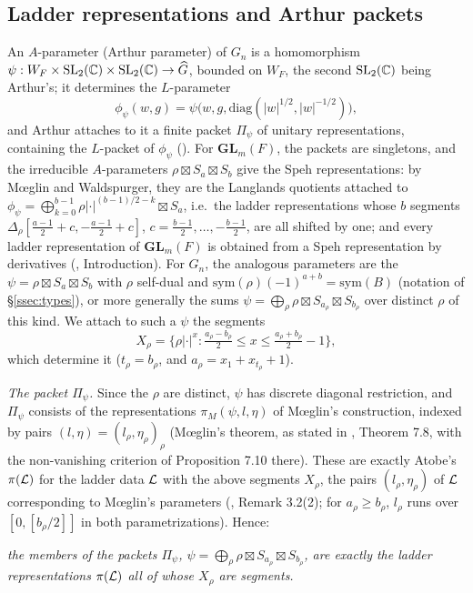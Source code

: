 \documentclass[a4paper,12pt,leqno]{amsart}
\theoremstyle{plain}
\theoremstyle{definition}
\begin{document}
\subsection{Ladder representations and Arthur packets}\label{ssec:arthur}
An $A$-parameter (Arthur parameter) of $G_n$
is a homomorphism $\psi:W_F\times\mathrm{SL}_2(\mathbb{C})\times\mathrm{SL}_2(\mathbb{C})\to\widehat G$, bounded on
$W_F$, the second $\mathrm{SL}_2(\mathbb{C})$ being Arthur's; it determines the $L$-parameter
\[\phi_\psi(w,g)=\psi\big(w,g,\mathrm{diag}(|w|^{1/2},|w|^{-1/2})\big),\]
and Arthur attaches to it a finite
packet $\Pi_\psi$ of unitary representations, containing the $L$-packet of $\phi_\psi$ (\cite{Art13}). For
$\mathbf{GL}_m(F)$, the packets are singletons, and the irreducible $A$-parameters
$\rho\boxtimes S_a\boxtimes S_b$ give the Speh representations: by M\oe glin and Waldspurger, they are
the Langlands quotients attached to $\phi_\psi=\bigoplus_{k=0}^{b-1}\rho|\cdot|^{(b-1)/2-k}\boxtimes
S_a$, i.e.\ the ladder representations whose $b$ segments $\Delta_\rho[\frac{a-1}2+c,-\frac{a-1}2+c]$,
$c=\frac{b-1}2,\ldots,-\frac{b-1}2$, are all shifted by one; and every ladder representation of
$\mathbf{GL}_m(F)$ is obtained from a Speh representation by derivatives (\cite{Ato24},
Introduction). For $G_n$, the analogous
parameters are the $\psi=\rho\boxtimes S_a\boxtimes S_b$ with $\rho$ self-dual and
$\mathrm{sym}(\rho)(-1)^{a+b}=\mathrm{sym}(B)$ (notation of \S\ref{ssec:types}), or more generally the
sums $\psi=\bigoplus_\rho\rho\boxtimes S_{a_\rho}\boxtimes S_{b_\rho}$ over distinct $\rho$ of this kind. We
attach to such a $\psi$ the segments
\[X_\rho=\{\rho|\cdot|^{x}:\tfrac{a_\rho-b_\rho}2\leq x\leq\tfrac{a_\rho+b_\rho}2-1\},\]
which determine it ($t_\rho=b_\rho$, and $a_\rho=x_1+x_{t_\rho}+1$).

\emph{The packet $\Pi_\psi$.}  Since the $\rho$ are distinct, $\psi$ has
discrete diagonal restriction, and $\Pi_\psi$ consists of the representations $\pi_M(\psi,l,\eta)$ of
M\oe glin's construction, indexed by pairs $(l,\eta)=(l_\rho,\eta_\rho)_\rho$ (M\oe glin's theorem, as
stated in \cite{Xu17b}, Theorem 7.8, with the non-vanishing criterion of Proposition 7.10 there). These
are exactly Atobe's $\pi(\mathcal{L})$ for the ladder data $\mathcal{L}$ with the above segments $X_\rho$, the pairs
$(l_\rho,\eta_\rho)$ of $\mathcal{L}$ corresponding to M\oe glin's parameters (\cite{Ato24}, Remark 3.2(2); for
$a_\rho\geq b_\rho$, $l_\rho$ runs over $[0,[b_\rho/2]]$ in both parametrizations). Hence:
\begin{center}
\emph{the members of the packets $\Pi_\psi$, $\psi=\bigoplus_\rho\rho\boxtimes S_{a_\rho}\boxtimes
S_{b_\rho}$, are exactly the ladder representations $\pi(\mathcal{L})$ all of whose $X_\rho$ are segments.}
\end{center}
\end{document}
